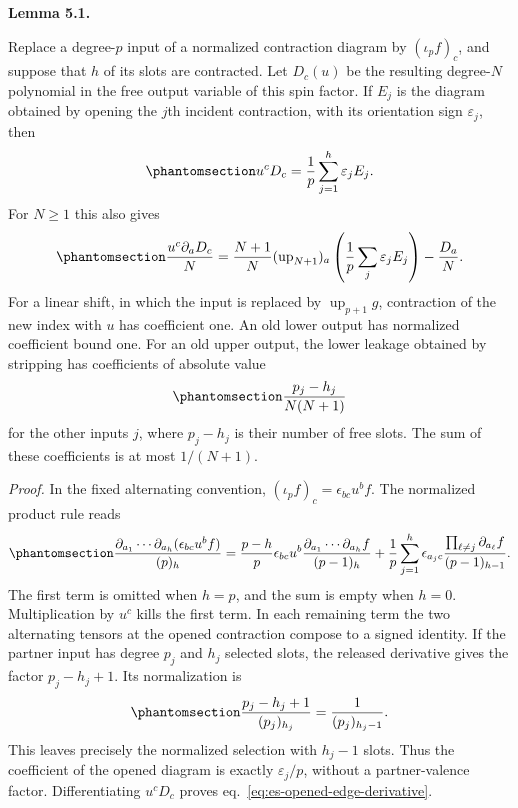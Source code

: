 \documentclass[
  english,
  11pt,
  reqno]{amsart}
\makeatletter
\newcommand{\pandocstatementheading}[1]{%
  \par\addpenalty{\@beginparpenalty}%
  \addvspace{.5\baselineskip plus .2\baselineskip minus .2\baselineskip}%
  {\normalfont\bfseries #1\par}%
  \nobreak\@afterindenttrue\@afterheading
}
\makeatother
\begin{document}
\pandocstatementheading{\protect{}\label{lem:es-opening}Lemma 5.1.}

Replace a degree-\(p\) input of a normalized contraction diagram by
\((\iota_pf)_c\), and suppose that \(h\) of its slots are contracted.
Let \(D_c(u)\) be the resulting degree-\(N\) polynomial in the free
output variable of this spin factor. If \(E_j\) is the diagram obtained
by opening the \(j\)th incident contraction, with its orientation sign
\(\varepsilon_j\), then
\begin{equation}\protect\phantomsection\label{eq:es-opened-edge}{
 u^cD_c=\frac1p\sum_{j=1}^h\varepsilon_jE_j.
}\end{equation} For \(N\ge1\) this also gives
\begin{equation}\protect\phantomsection\label{eq:es-opened-edge-derivative}{
 \frac{u^c\partial_aD_c}{N}
 =\frac{N+1}{N}(\operatorname{up}_{N+1})_a
       \left(\frac1p\sum_j\varepsilon_jE_j\right)
       -\frac{D_a}{N}.
}\end{equation} For a linear shift, in which the input is replaced by
\(\operatorname{up}_{p+1}g\), contraction of the new index with \(u\)
has coefficient one. An old lower output has normalized coefficient
bound one. For an old upper output, the lower leakage obtained by
stripping has coefficients of absolute value
\begin{equation}\protect\phantomsection\label{eq:es-linear-leakage-coefficient}{
 \frac{p_j-h_j}{N(N+1)}
}\end{equation} for the other inputs \(j\), where \(p_j-h_j\) is their
number of free slots. The sum of these coefficients is at most
\(1/(N+1)\).

\emph{Proof.} In the fixed alternating convention,
\((\iota_pf)_c=\epsilon_{bc}u^bf\). The normalized product rule reads
\begin{equation}\protect\phantomsection\label{eq:es-normalized-product}{
 \frac{\partial_{a_1}\cdots\partial_{a_h}
                  (\epsilon_{bc}u^bf)}{(p)_h}
 =\frac{p-h}{p}\epsilon_{bc}u^b
       \frac{\partial_{a_1}\cdots\partial_{a_h}f}{(p-1)_h}
  +\frac1p\sum_{j=1}^h\epsilon_{a_jc}
       \frac{\prod_{\ell\ne j}\partial_{a_\ell}f}{(p-1)_{h-1}}.
}\end{equation} The first term is omitted when \(h=p\), and the sum is
empty when \(h=0\). Multiplication by \(u^c\) kills the first term. In
each remaining term the two alternating tensors at the opened
contraction compose to a signed identity. If the partner input has
degree \(p_j\) and \(h_j\) selected slots, the released derivative gives
the factor \(p_j-h_j+1\). Its normalization is
\begin{equation}\protect\phantomsection\label{eq:es-partner-normalization}{
 \frac{p_j-h_j+1}{(p_j)_{h_j}}
       =\frac1{(p_j)_{h_j-1}}.
}\end{equation} This leaves precisely the normalized selection with
\(h_j-1\) slots. Thus the coefficient of the opened diagram is exactly
\(\varepsilon_j/p\), without a partner-valence factor. Differentiating
\(u^cD_c\) proves eq.~\ref{eq:es-opened-edge-derivative}.
\end{document}
